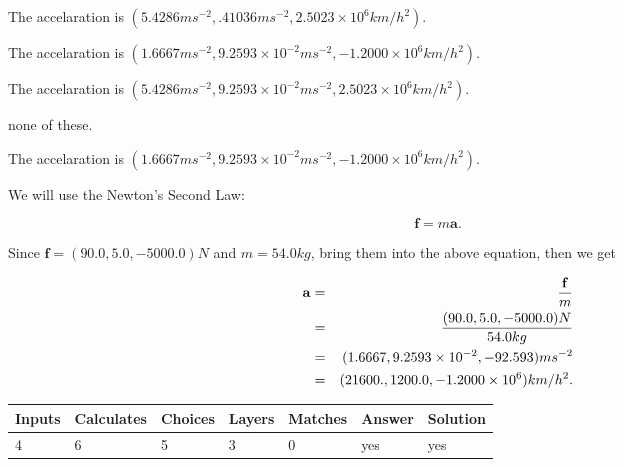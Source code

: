 \documentclass[12pt]{article}
\begin{document}
 
The accelaration is
$(
5.4286ms^{-2},
.41036ms^{-2},
2.5023 \times 10^{6}km/h^2
).
$
 
 
The accelaration is
$(
1.6667ms^{-2},
9.2593 \times 10^{-2}ms^{-2},
-1.2000 \times 10^{6}km/h^2
).
$
 
 
The accelaration is
$(
5.4286ms^{-2},
9.2593 \times 10^{-2}ms^{-2},
2.5023 \times 10^{6}km/h^2
).
$
 
 
none of these.
 
 
\noindent{}
 
 
The accelaration is
$(
1.6667ms^{-2},
9.2593 \times 10^{-2}ms^{-2},
-1.2000 \times 10^{6}km/h^2
).
$
 
 
\noindent{}
 
 
 
 
 
 
\noindent{}
 
 

We will use the Newton's Second Law:
 
\[
\mathbf{f}=m\mathbf{a}.
\]
 
Since $\mathbf{f}=( %
90.0,  %
5.0,  %
-5000.0 )N$
and $m= %
54.0kg$, bring them into the above equation, then we get
 
\begin{eqnarray*}
\mathbf{a}&=&\frac{\mathbf{f}}m  \\
&=&\frac{(
90.0 ,
5.0 ,
-5000.0 )N
}{ %
54.0 kg}  \\
&=&(
1.6667 ,
9.2593 \times 10^{-2},
-92.593
)ms^{-2} \\
&=&(
21600. ,
1200.0 ,
-1.2000 \times 10^{6}
)km/h^2.
\end{eqnarray*}
 
 
 
\noindent{}
 
 

 
\vspace{0.3in}
   
   
   
   
\noindent\begin{tabular}{|l|l|l|l|l|l|l|}
 \hline
Inputs & Calculates & Choices & Layers & Matches & Answer & Solution \\ \hline
           4 & 
           6 & 
           5
  & 
           3 & 
           0 & 
  yes & 
  yes 
  \\ \hline
 \end{tabular}
   
\end{document}
